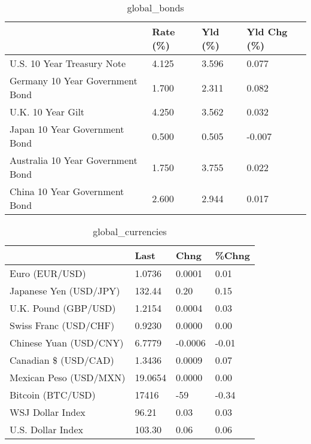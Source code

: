 \documentclass{article}%
\begin{document}
%


\begin{table}[htbp]%
\caption{global\_bonds}%
\centering%
\begin{adjustbox}{width=1\textwidth}%
\begin{tabular}{llll}
\toprule
                                  & Rate (\%) & Yld (\%) & Yld Chg (\%) \\
\midrule
       U.S. 10 Year Treasury Note &    4.125 &   3.596 &       0.077 \\
  Germany 10 Year Government Bond &    1.700 &   2.311 &       0.082 \\
                U.K. 10 Year Gilt &    4.250 &   3.562 &       0.032 \\
    Japan 10 Year Government Bond &    0.500 &   0.505 &      -0.007 \\
Australia 10 Year Government Bond &    1.750 &   3.755 &       0.022 \\
    China 10 Year Government Bond &    2.600 &   2.944 &       0.017 \\
\bottomrule
\end{tabular}
%
\end{adjustbox}%
\end{table}

%


\begin{table}[htbp]%
\caption{global\_currencies}%
\centering%
\begin{adjustbox}{width=1\textwidth}%
\begin{tabular}{llll}
\toprule
                       &    Last &    Chng & \%Chng \\
\midrule
        Euro (EUR/USD) &  1.0736 &  0.0001 &  0.01 \\
Japanese Yen (USD/JPY) &  132.44 &    0.20 &  0.15 \\
  U.K. Pound (GBP/USD) &  1.2154 &  0.0004 &  0.03 \\
 Swiss Franc (USD/CHF) &  0.9230 &  0.0000 &  0.00 \\
Chinese Yuan (USD/CNY) &  6.7779 & -0.0006 & -0.01 \\
  Canadian \$ (USD/CAD) &  1.3436 &  0.0009 &  0.07 \\
Mexican Peso (USD/MXN) & 19.0654 &  0.0000 &  0.00 \\
     Bitcoin (BTC/USD) &   17416 &     -59 & -0.34 \\
      WSJ Dollar Index &   96.21 &    0.03 &  0.03 \\
     U.S. Dollar Index &  103.30 &    0.06 &  0.06 \\
\bottomrule
\end{tabular}
%
\end{adjustbox}%
\end{table}
\end{document}
